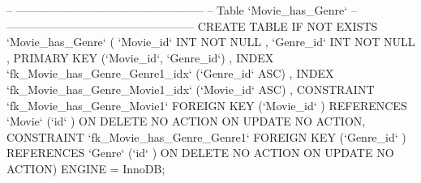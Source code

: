 \begin{spverbatim}
-- --------------------------------------------------
-- Table `Movie_has_Genre`
-- --------------------------------------------------
CREATE  TABLE IF NOT EXISTS `Movie_has_Genre` (
  `Movie_id` INT NOT NULL ,
  `Genre_id` INT NOT NULL ,
  PRIMARY KEY (`Movie_id`, `Genre_id`) ,
  INDEX `fk_Movie_has_Genre_Genre1_idx` (`Genre_id` ASC) ,
  INDEX `fk_Movie_has_Genre_Movie1_idx` (`Movie_id` ASC) ,
  CONSTRAINT `fk_Movie_has_Genre_Movie1`
    FOREIGN KEY (`Movie_id` )
    REFERENCES `Movie` (`id` )
    ON DELETE NO ACTION
    ON UPDATE NO ACTION,
  CONSTRAINT `fk_Movie_has_Genre_Genre1`
    FOREIGN KEY (`Genre_id` )
    REFERENCES `Genre` (`id` )
    ON DELETE NO ACTION
    ON UPDATE NO ACTION)
ENGINE = InnoDB;
\end{spverbatim}
\newpage

